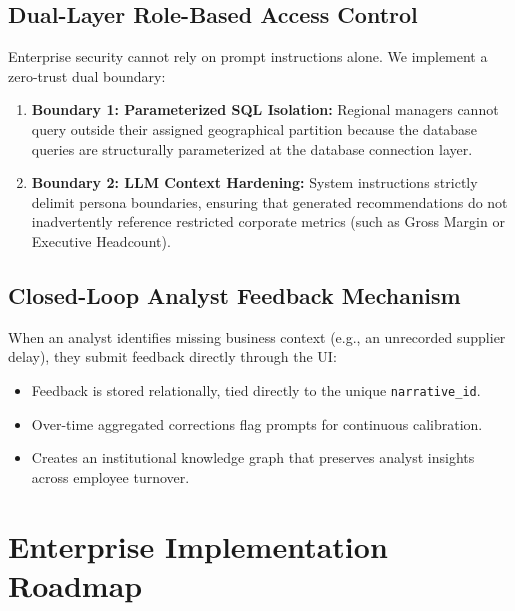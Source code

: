 \documentclass[11pt,a4paper]{article}
\begin{document}
\subsection{Dual-Layer Role-Based Access Control}
Enterprise security cannot rely on prompt instructions alone. We implement a zero-trust dual boundary:
\begin{enumerate}
    \item \textbf{Boundary 1: Parameterized SQL Isolation:} Regional managers cannot query outside their assigned geographical partition because the database queries are structurally parameterized at the database connection layer.
    \item \textbf{Boundary 2: LLM Context Hardening:} System instructions strictly delimit persona boundaries, ensuring that generated recommendations do not inadvertently reference restricted corporate metrics (such as Gross Margin or Executive Headcount).
\end{enumerate}

\subsection{Closed-Loop Analyst Feedback Mechanism}
When an analyst identifies missing business context (e.g., an unrecorded supplier delay), they submit feedback directly through the UI:
\begin{itemize}[noitemsep]
    \item Feedback is stored relationally, tied directly to the unique \texttt{narrative\_id}.
    \item Over-time aggregated corrections flag prompts for continuous calibration.
    \item Creates an institutional knowledge graph that preserves analyst insights across employee turnover.
\end{itemize}

\newpage
\section{Enterprise Implementation Roadmap}
\end{document}
